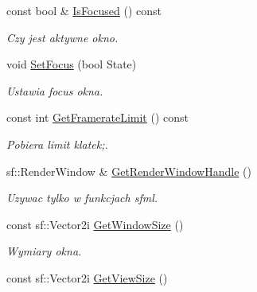 \begin{DoxyCompactItemize}
const bool \& \mbox{\hyperlink{classtfp_1_1_screen_aa27dec08639e5aadcdce2af3674db316}{Is\+Focused}} () const
\begin{DoxyCompactList}\small\item\em Czy jest aktywne okno. \end{DoxyCompactList}\item 
\mbox{\label{classtfp_1_1_screen_af2f7112d8498bb2ee538929e6c96921d}} 
void \mbox{\hyperlink{classtfp_1_1_screen_af2f7112d8498bb2ee538929e6c96921d}{Set\+Focus}} (bool State)
\begin{DoxyCompactList}\small\item\em Ustawia focus okna. \end{DoxyCompactList}\item 
\mbox{\label{classtfp_1_1_screen_a4b985b553b9592d774226fc4edc5488c}} 
const int \mbox{\hyperlink{classtfp_1_1_screen_a4b985b553b9592d774226fc4edc5488c}{Get\+Framerate\+Limit}} () const
\begin{DoxyCompactList}\small\item\em Pobiera limit klatek;. \end{DoxyCompactList}\item 
\mbox{\label{classtfp_1_1_screen_a1cdd94f37e5f93003e2e1026fb204aec}} 
sf\+::\+Render\+Window \& \mbox{\hyperlink{classtfp_1_1_screen_a1cdd94f37e5f93003e2e1026fb204aec}{Get\+Render\+Window\+Handle}} ()
\begin{DoxyCompactList}\small\item\em Uzywac tylko w funkcjach sfml. \end{DoxyCompactList}\item 
\mbox{\label{classtfp_1_1_screen_a840bee6a6f3f201da6daa388ff15e850}} 
const sf\+::\+Vector2i \mbox{\hyperlink{classtfp_1_1_screen_a840bee6a6f3f201da6daa388ff15e850}{Get\+Window\+Size}} ()
\begin{DoxyCompactList}\small\item\em Wymiary okna. \end{DoxyCompactList}\item 
\mbox{\label{classtfp_1_1_screen_a88b2486f29909286c7388328722414d2}} 
const sf\+::\+Vector2i \mbox{\hyperlink{classtfp_1_1_screen_a88b2486f29909286c7388328722414d2}{Get\+View\+Size}} ()

\end{DoxyCompactItemize}
